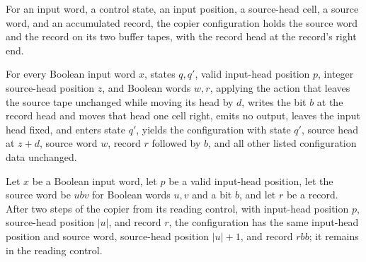 \begin{definition}
\label{Complexity.clCopyCfg}
\leanok
{}
For an input word, a control state, an input position, a source-head cell, a source word, and an accumulated record, the copier configuration holds the source word and the record on its two buffer tapes, with the record head at the record's right end.
\end{definition}

\begin{lemma}
\label{Complexity.clCopy_write}
\leanok
{}
For every Boolean input word $x$, states $q,q'$, valid input-head position $p$, integer
source-head position $z$, and Boolean words $w,r$, applying the action that leaves the
source tape unchanged while moving its head by $d$, writes the bit $b$ at the record
head and moves that head one cell right, emits no output, leaves the input head fixed,
and enters state $q'$, yields the configuration with state $q'$, source head at $z+d$,
source word $w$, record $r$ followed by $b$, and all other listed configuration data
unchanged.
\end{lemma}

\begin{lemma}
\label{Complexity.clCopy_pair}
\leanok
{}
Let $x$ be a Boolean input word, let $p$ be a valid input-head position, let the source
word be $u b v$ for Boolean words $u,v$ and a bit $b$, and let $r$ be a record. After
two steps of the copier from its reading control, with input-head position $p$,
source-head position $|u|$, and record $r$, the configuration has the same input-head
position and source word, source-head position $|u|+1$, and record $rbb$; it remains in
the reading control.
\end{lemma}

